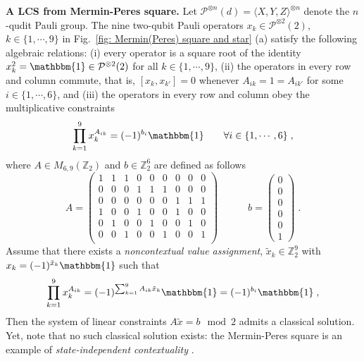 \documentclass[aps,pra,letterpaper,onrcolumn,nofootinbib,notitlepage,longbibliography]{revtex4-1}
\newcommand{\one}{\mathbbm{1}}
\newcommand{\zz}{\mathbb Z}
\newcommand\mc[1]{\mathcal{#1}}
\newcommand{\cP}{\mc{P}}
\begin{document}
\textbf{A LCS from Mermin-Peres square.} Let $\cP^{\otimes 
n}(d)=\langle X,Y,Z \rangle^{\otimes n}$ denote the $n$-qudit Pauli group. The nine two-qubit Pauli operators $x_k\in\cP^{\otimes 2}(2)$, $k\in\{1,\cdots,9\}$ in Fig.~\ref{fig: Mermin(Peres) square and star} (a) satisfy the following algebraic relations: (i) every operator is a square root of the identity $x_k^2 = \one \in \cP^{\otimes 2}(2)$ for all $k \in \{1,\cdots,9\}$, (ii) the operators in every row and column commute, that is, $[x_k,x_{k'}] = 0$ whenever $A_{ik} = 1 = A_{ik'}$ for some $i\in\{1,\cdots,6\}$, and (iii) the operators in every row and column obey the multiplicative constraints
\begin{equation*}
    \prod_{k=1}^9 x_k^{A_{ik}} = (-1)^{b_i}\one \quad\quad\forall i\in\{1,\cdots,6\}\; ,
\end{equation*}
where $A \in M_{6,9}(\zz_2)$ and $b \in \zz^6_2$ are defined as follows
\begin{equation}\label{eq: MP-square LCS}
    A = \begin{pmatrix}
         1 & 1 & 1 & 0 & 0 & 0 & 0 & 0 & 0  \\
         0 & 0 & 0 & 1 & 1 & 1 & 0 & 0 & 0  \\
         0 & 0 & 0 & 0 & 0 & 0 & 1 & 1 & 1  \\
         1 & 0 & 0 & 1 & 0 & 0 & 1 & 0 & 0  \\
         0 & 1 & 0 & 0 & 1 & 0 & 0 & 1 & 0  \\
         0 & 0 & 1 & 0 & 0 & 1 & 0 & 0 & 1  \\
    \end{pmatrix} \quad \quad \quad b = \begin{pmatrix}
         0 \\ 0 \\ 0 \\ 0 \\ 0 \\ 1
    \end{pmatrix} \; .
\end{equation}
Assume that there exists a \emph{noncontextual value assignment}, $\tilde{x}_k \in \zz^9_2$ with $x_k = (-1)^{\tilde{x}_k}\one$ such that
\begin{equation}\label{eq: LCS relation}
    \prod_{k=1}^9 x_k^{A_{ik}} = (-1)^{\sum_{k=1}^9 A_{ik}\tilde{x}_k}\one = (-1)^{b_i}\one\; ,
\end{equation}
Then the system of linear constraints $A\tilde{x}=b\mod 2$ admits a classical solution. Yet, note that no such classical solution exists: the Mermin-Peres square is an example of \emph{state-independent contextuality} \cite{Mermin1990,Peres1991}.
\end{document}
